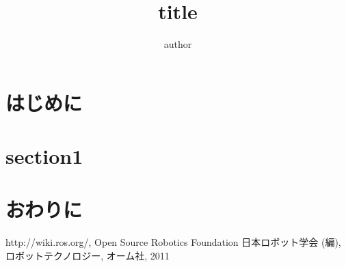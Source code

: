 ﻿\documentclass[a4j]{jarticle}
\title{title}
\author{author}
\begin{document}
\maketitle

\section{はじめに}

\section{section1}

\section{おわりに}

\begin{thebibliography}{9}
\vspace{-1mm}
\itemsep -1.7pt
{\footnotesize
{}
{http://wiki.ros.org/, Open Source Robotics Foundation}
{日本ロボット学会 (編), ロボットテクノロジー, オーム社, 2011}
}

\end{thebibliography}
\end{document}
